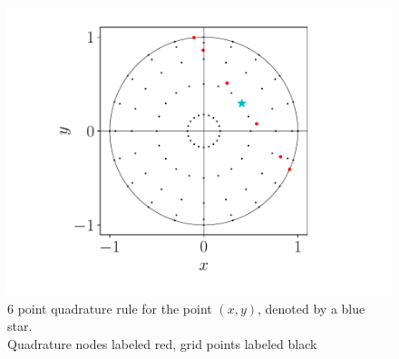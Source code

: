     
\begin{figure}[H]
	\centering
	\includegraphics[scale=0.5]{figures/quad_5.pdf}
    \caption{6 point quadrature rule for the point $(x,y)$, denoted by a blue star.\\ Quadrature nodes labeled red, grid points labeled black}
\end{figure}
    
